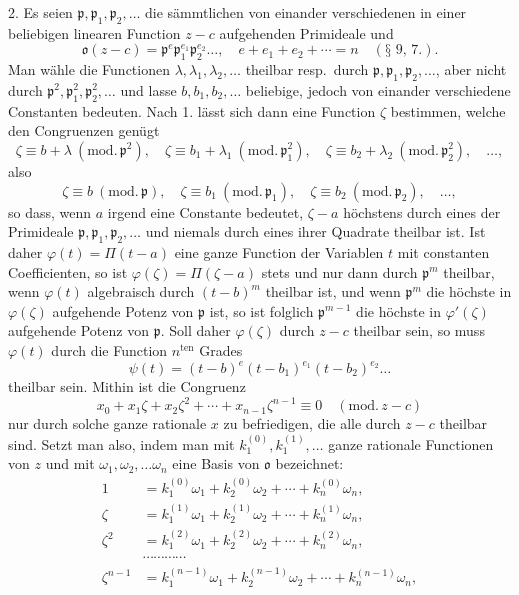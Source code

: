 \documentclass{article}
\begin{document}

2. Es seien $\mathfrak{p}, \mathfrak{p}_{1}, \mathfrak{p}_{2}, \ldots$ die sämmtlichen von einander verschiedenen in einer beliebigen linearen Function $z-c$ aufgehenden Primideale und
\[ \mathfrak{o}(z-c) = \mathfrak{p}^{e}\mathfrak{p}_{1}^{e_{1}}\mathfrak{p}_{2}^{e_{2}}\ldots, \quad e + e_{1} + e_{2} + \cdots = n \quad (\text{§~9, 7.}). \]
Man wähle die Functionen $\lambda, \lambda_{1}, \lambda_{2}, \ldots$ theilbar resp.\ durch $\mathfrak{p}, \mathfrak{p}_{1}, \mathfrak{p}_{2}, \ldots$, aber nicht durch $\mathfrak{p}^{2}, \mathfrak{p}_{1}^{2}, \mathfrak{p}_{2}^{2}, \ldots$ und lasse $b, b_{1}, b_{2}, \ldots$ beliebige, jedoch von einander verschiedene Constanten bedeuten. Nach 1. lässt sich dann eine Function $\zeta$ bestimmen, welche den Congruenzen genügt
\[ \zeta \equiv b + \lambda \ (\text{mod.}\,\mathfrak{p}^{2}), \quad \zeta \equiv b_{1} + \lambda_{1} \ (\text{mod.}\,\mathfrak{p}_{1}^{2}), \quad \zeta \equiv b_{2} + \lambda_{2} \ (\text{mod.}\,\mathfrak{p}_{2}^{2}), \quad \ldots, \]
also
\[ \zeta \equiv b \ (\text{mod.}\,\mathfrak{p}), \quad \zeta \equiv b_{1} \ (\text{mod.}\,\mathfrak{p}_{1}), \quad \zeta \equiv b_{2} \ (\text{mod.}\,\mathfrak{p}_{2}), \quad \ldots, \]
so dass, wenn $a$ irgend eine Constante bedeutet, $\zeta-a$ höchstens durch eines der Primideale $\mathfrak{p}, \mathfrak{p}_{1}, \mathfrak{p}_{2}, \ldots$ und niemals durch eines ihrer Quadrate theilbar ist. Ist daher $\varphi(t) = \Pi(t-a)$ eine ganze Function der Variablen $t$ mit constanten Coefficienten, so ist $\varphi(\zeta) = \Pi(\zeta-a)$ stets und nur dann durch $\mathfrak{p}^{m}$ theilbar, wenn $\varphi(t)$ algebraisch durch $(t-b)^{m}$ theilbar ist, und wenn $\mathfrak{p}^{m}$ die höchste in $\varphi(\zeta)$ aufgehende Potenz von $\mathfrak{p}$ ist, so ist folglich $\mathfrak{p}^{m-1}$ die höchste in $\varphi'(\zeta)$ aufgehende Potenz von $\mathfrak{p}$. Soll daher $\varphi(\zeta)$ durch $z-c$ theilbar sein, so muss $\varphi(t)$ durch die Function $n^{\text{ten}}$ Grades
\[ \psi(t) = (t-b)^{e}(t-b_{1})^{e_{1}}(t-b_{2})^{e_{2}}\ldots \]
theilbar sein. Mithin ist die Congruenz
\[ x_{0} + x_{1}\zeta + x_{2}\zeta^{2} + \cdots + x_{n-1}\zeta^{n-1} \equiv 0 \quad (\text{mod.}\,z-c) \]
nur durch solche ganze rationale $x$ zu befriedigen, die alle durch $z-c$ theilbar sind. Setzt man also, indem man mit $k_{1}^{(0)}, k_{1}^{(1)}, \ldots$ ganze rationale Functionen von $z$ und mit $\omega_{1}, \omega_{2}, \ldots \omega_{n}$ eine Basis von $\mathfrak{o}$ bezeichnet:
\[ \begin{aligned} 1 &= k_{1}^{(0)}\omega_{1} + k_{2}^{(0)}\omega_{2} + \cdots + k_{n}^{(0)}\omega_{n}, \\ \zeta &= k_{1}^{(1)}\omega_{1} + k_{2}^{(1)}\omega_{2} + \cdots + k_{n}^{(1)}\omega_{n}, \\ \zeta^{2} &= k_{1}^{(2)}\omega_{1} + k_{2}^{(2)}\omega_{2} + \cdots + k_{n}^{(2)}\omega_{n}, \\ &\cdots\cdots\cdots\cdots \\ \zeta^{n-1} &= k_{1}^{(n-1)}\omega_{1} + k_{2}^{(n-1)}\omega_{2} + \cdots + k_{n}^{(n-1)}\omega_{n}, \end{aligned} \]
\end{document}
